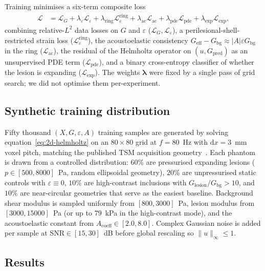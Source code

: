\documentclass[11pt,letterpaper]{article}
\newcommand{\Geff}{G_{\mathrm{eff}}}
\newcommand{\Gbg}{G_{\mathrm{bg}}}
\newcommand{\eps}{\varepsilon}
\begin{document}
Training minimises a six-term composite loss
\begin{align}
\mathcal{L} &= \mathcal{L}_{G}
+ \lambda_{\eps}\mathcal{L}_{\eps}
+ \lambda_{\mathrm{ring}}\mathcal{L}^{\mathrm{ring}}_{\eps}
+ \lambda_{\mathrm{ac}}\mathcal{L}_{\mathrm{ac}}
+ \lambda_{\mathrm{pde}}\mathcal{L}_{\mathrm{pde}}
+ \lambda_{\mathrm{exp}}\mathcal{L}_{\mathrm{exp}},
\label{eq:loss}
\end{align}
combining relative-$L^{2}$ data losses on $G$ and $\eps$
($\mathcal{L}_{G},\mathcal{L}_{\eps}$), a perilesional-shell-restricted
strain loss ($\mathcal{L}^{\mathrm{ring}}_{\eps}$), the acoustoelastic
consistency $\Geff-\Gbg\approx|A|\eps\Gbg$ in the ring
($\mathcal{L}_{\mathrm{ac}}$), the residual of the Helmholtz operator on
$(u,G_{\mathrm{pred}})$ as an unsupervised PDE term
($\mathcal{L}_{\mathrm{pde}}$), and a binary cross-entropy classifier of
whether the lesion is expanding ($\mathcal{L}_{\mathrm{exp}}$). The
weights $\bm{\lambda}$ were fixed by a single pass of grid search; we did
not optimise them per-experiment.

\subsection*{Synthetic training distribution}

Fifty thousand $(X,G,\eps,A)$ training samples are generated by solving
equation~\eqref{eq:2d-helmholtz} on an $80\!\times\!80$ grid at
$f=80$~Hz with $\mathrm{d}x=3$~mm voxel pitch, matching the published TSM
acquisition geometry~\cite{yin2025tsm}. Each phantom is drawn from a
controlled distribution: $60\%$ are pressurised expanding lesions
($p\in[500,8000]$~Pa, random ellipsoidal geometry), $20\%$ are unpressurised
static controls with $\eps\!\equiv\!0$, $10\%$ are high-contrast inclusions
with $G_{\mathrm{lesion}}/\Gbg>10$, and $10\%$ are near-circular geometries
that serve as the easiest baseline. Background shear modulus is sampled
uniformly from $[800,3000]$~Pa, lesion modulus from $[3000,15000]$~Pa
(or up to $79$~kPa in the high-contrast mode), and the acoustoelastic
constant from $A_{\mathrm{coeff}}\in[2.0,8.0]$. Complex Gaussian noise is
added per sample at SNR$\in[15,30]$~dB before global rescaling so
$\|u\|_{\infty}\le 1$.

\subsection*{Results}
\end{document}
